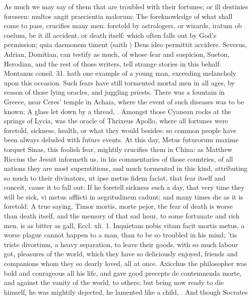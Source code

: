 {{As much we may say of them that are troubled with their fortunes; or
ill destinies foreseen: multos angit praecientia malorum: The
foreknowledge of what shall come to pass, crucifies many men: foretold
by astrologers, or wizards, iratum ob coelum, be it ill accident, or
death itself: which often falls out by God's permission; quia daemonem
timent (saith \Chrysostom{}) Deus ideo permittit accidere. Severus,
Adrian, Domitian, can testify as much, of whose fear and suspicion,
Sueton, Herodian, and the rest of those writers, tell strange stories
in this behalf. Montanus consil. 31. hath one example of a young
man, exceeding melancholy upon this occasion. Such fears have still
tormented mortal men in all ages, by reason of those lying oracles, and
juggling priests. There was a fountain in Greece, near Ceres'
temple in Achaia, where the event of such diseases was to be known; A
glass let down by a thread, \etc{}. Amongst those Cyanean rocks at the
springs of Lycia, was the oracle of Thrixeus Apollo, where all fortunes
were foretold, sickness, health, or what they would besides: so common
people have been always deluded with future events. At this day, Metus
futurorum maxime torquet Sinas, this foolish fear, mightily crucifies
them in China: as Matthew Riccius the Jesuit informeth us, in his
commentaries of those countries, of all nations they are most
superstitious, and much tormented in this kind, attributing so much to
their divinators, ut ipse metus fidem faciat, that fear itself and
conceit, cause it to fall out: If he foretell sickness such a
day, that very time they will be sick, vi metus afflicti in
aegritudinem cadunt; and many times die as it is foretold. A true
saying, Timor mortis, morte pejor, the fear of death is worse than
death itself, and the memory of that sad hour, to some fortunate and
rich men, is as bitter as gall, Eccl. xli. 1. Inquietam nobis vitam
facit mortis metus, a worse plague cannot happen to a man, than to be
so troubled in his mind; 'tis triste divortium, a heavy separation, to
leave their goods, with so much labour got, pleasures of the world,
which they have so deliciously enjoyed, friends and companions whom
they so dearly loved, all at once. Axicchus the philosopher was bold
and courageous all his life, and gave good precepts de contemnenda
morte, and against the vanity of the world, to others; but being now
ready to die himself, he was mightily dejected,  he lamented like a child, \etc{}. And though Socrates
}}
